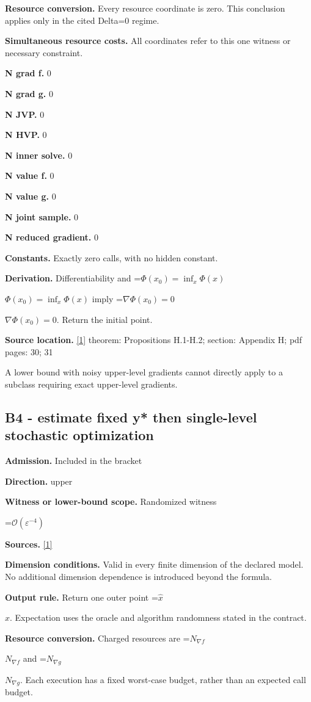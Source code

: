 \documentclass[10pt,a4paper]{article}
\newcommand{\AtlasMath}[1]{\par\begingroup\centering\setbox0=\hbox{$\displaystyle #1$}\ifdim\wd0>1.4\linewidth\typeout{ATLAS WIDE FORMULA: \the\wd0}\fi\ifdim\wd0>\linewidth\resizebox{\linewidth}{!}{\box0}\else\box0\fi\par\endgroup}
\newcommand{\AtlasInlineMath}[1]{\begingroup\setbox0=\hbox{$#1$}\ifdim\wd0>.4\linewidth\endgroup\AtlasMath{#1}\else\endgroup$#1$\fi}
\begin{document}
\textbf{Resource conversion.} Every resource coordinate is zero. This conclusion applies only in the cited Delta=0 regime.

\textbf{Simultaneous resource costs.} All coordinates refer to this one witness or necessary constraint.

\textbf{N grad f.} 0

\textbf{N grad g.} 0

\textbf{N JVP.} 0

\textbf{N HVP.} 0

\textbf{N inner solve.} 0

\textbf{N value f.} 0

\textbf{N value g.} 0

\textbf{N joint sample.} 0

\textbf{N reduced gradient.} 0

\textbf{Constants.} Exactly zero calls, with no hidden constant.

\textbf{Derivation.} Differentiability and \AtlasInlineMath{\Phi(x_0)=\inf_x\Phi(x)} imply \AtlasInlineMath{\nabla\Phi(x_0)=0}. Return the initial point.

\textbf{Source location.} \href{https://arxiv.org/pdf/2610.03638v2}{[1]} theorem: Propositions H.1-H.2; section: Appendix H; pdf pages: 30; 31

A lower bound with noisy upper-level gradients cannot directly apply to a subclass requiring exact upper-level gradients.

\subsection{B4 - estimate fixed y* then single-level stochastic optimization}
\textbf{Admission.} Included in the bracket

\textbf{Direction.} upper

\textbf{Witness or lower-bound scope.} Randomized witness

\AtlasMath{\mathcal{O}(\varepsilon^{-4})}
\textbf{Sources.} \href{https://arxiv.org/pdf/2610.03638v2}{[1]}

\textbf{Dimension conditions.} Valid in every finite dimension of the declared model. No additional dimension dependence is introduced beyond the formula.

\textbf{Output rule.} Return one outer point \AtlasInlineMath{\widehat x}. Expectation uses the oracle and algorithm randomness stated in the contract.

\textbf{Resource conversion.} Charged resources are \AtlasInlineMath{N_{\nabla f}} and \AtlasInlineMath{N_{\nabla g}}. Each execution has a fixed worst-case budget, rather than an expected call budget.
\end{document}
